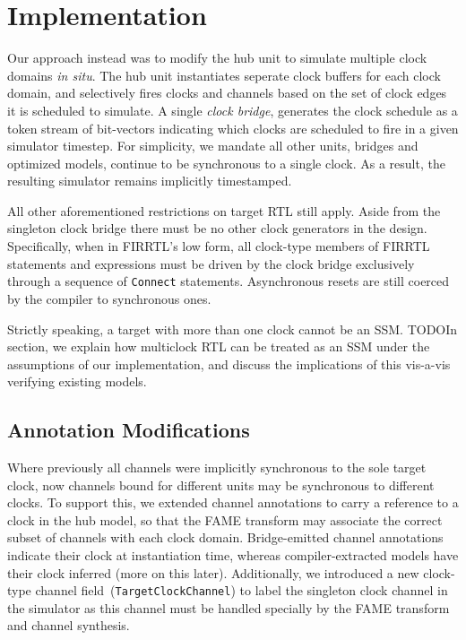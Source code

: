 

\section{Implementation}

Our approach instead was to modify the hub unit to simulate multiple clock
domains \emph{in situ}. The hub unit instantiates seperate clock buffers for
each clock domain, and selectively fires clocks and channels based on the set
of clock edges it is scheduled to simulate. A single \emph{clock bridge},
generates the clock schedule as a token stream of bit-vectors indicating which
clocks are scheduled to fire in a given simulator timestep. For simplicity, we
mandate all other units, bridges and optimized models, continue to be
synchronous to a single clock. As a result, the resulting simulator remains
implicitly timestamped.

All other aforementioned restrictions on target RTL still apply. Aside from
the singleton clock bridge there must be no other clock generators in the
design. Specifically, when in FIRRTL's low form, all clock-type members of FIRRTL statements and expressions
must be driven by the clock bridge exclusively through a sequence of
\texttt{Connect} statements. Asynchronous resets are still coerced by the
compiler to synchronous ones.

Strictly speaking, a target with more than one clock cannot be an SSM. TODO{In
section}, we explain how multiclock RTL can be treated as an SSM under the
assumptions of our implementation, and discuss the implications of this
vis-a-vis verifying existing models.

\subsection{Annotation Modifications}

Where previously all channels were implicitly synchronous to the sole target
clock, now channels bound for different units may be synchronous to different
clocks. To support this, we extended channel annotations to carry a reference
to a clock in the hub model, so that the FAME transform may associate the
correct subset of channels with each clock domain. Bridge-emitted channel
annotations indicate their clock at instantiation time,
whereas compiler-extracted models have their clock inferred (more on this
later). Additionally, we introduced a new clock-type channel
field~(\texttt{TargetClockChannel}) to label the singleton clock channel in the
simulator as this channel must be handled specially by the FAME transform and channel
synthesis.

